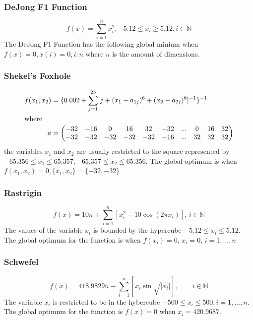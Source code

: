 \subsubsection{DeJong F1 Function}
\begin{equation}
\label{eq:DeJongF1}
	f(x) = \sum_{i=1}^n x^2_i, -5.12 \leq x_i \geq 5.12, i \in \mathbb{N}
\end{equation}
The DeJong F1 Function has the following global minium when $f(x) = 0, x(i) = 0, i:n$ where $n$ is the amount of dimensions. 
\subsubsection{Shekel's Foxhole}
\begin{align}
	f(x_1,x_2) &= \{0.002 + \sum^{25}_{j=1} [j + (x_1 - a_{1j})^6 + (x_2 - a_{2j})^6]^{-1}\}^{-1}\\
\intertext{where}
	a &= \begin{pmatrix} \nonumber
			-32 & -16 & 0 & 16 & 32 & -32 & ... & 0 & 16 & 32 \\
			-32 & -32 & -32 & -32 & -32 & -16 & ... & 32 & 32 & 32 \\
		 \end{pmatrix}
\end{align}
the variables $x_1$ and $x_2$ are usually restricted to the square represented by $-65.356 \leq x_1 \leq 65.357, -65.357 \leq x_2 \leq 65.356$. The global optimum is when $f(x_1,x_2) = 0, \{x_1,x_2\} = \{-32,-32\}$
\subsubsection{Rastrigin}
\begin{equation}
	f(x) = 10n + \sum_{i=1}^n [x_i^2 - 10\cos(2 \pi x_i)],\, i \in \mathbb{N}
\end{equation}
The values of the variable $x_i$ is bounded by the hypercube $-5.12 \leq x_i \leq 5.12$. The global optimum for the function is when $f(x_i) = 0,\, x_i = 0, \, i = 1,\dots,n$
\subsubsection{Schwefel}
\begin{equation}
	f(x) = 418.9829n - \sum^n_{i=1} [x_i\sin{\sqrt{|x_i|}}], \qquad i \in \mathbb{N}
\end{equation}
The variable $x_i$ is restricted to be in the hybercube $-500 \leq x_i \leq 500, i = 1,\ldots,n$. The global optimum for the function is $f(x) = 0$ when $x_i = 420.9687$.
